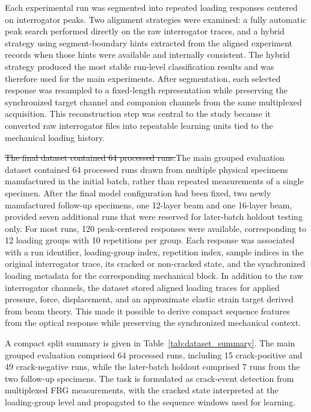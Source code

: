 \documentclass[notspecified,article,submit,pdftex,moreauthors]{Definitions/mdpi}
\newcommand{\rev}[1]{{\color{red}#1}}
\newcommand{\revdel}[1]{{\color{red}\sout{#1}}}
\begin{document}
Each experimental run was segmented into repeated loading responses centered on interrogator peaks. Two alignment strategies were examined: a fully automatic peak search performed directly on the raw interrogator traces, and a hybrid strategy using segment-boundary hints extracted from the aligned experiment records when those hints were available and internally consistent. The hybrid strategy produced the most stable run-level classification results and was therefore used for the main experiments. After segmentation, each selected response was resampled to a fixed-length representation while preserving the synchronized target channel and companion channels from the same multiplexed acquisition. This reconstruction step was central to the study because it converted raw interrogator files into repeatable learning units tied to the mechanical loading history.

\revdel{The final dataset contained 64 processed runs.}\rev{The main grouped evaluation dataset contained 64 processed runs drawn from multiple physical specimens manufactured in the initial batch, rather than repeated measurements of a single specimen. After the final model configuration had been fixed, two newly manufactured follow-up specimens, one 12-layer beam and one 16-layer beam, provided seven additional runs that were reserved for later-batch holdout testing only.} For most runs, 120 peak-centered responses were available, corresponding to 12 loading groups with 10 repetitions per group. Each response was associated with a run identifier, loading-group index, repetition index, sample indices in the original interrogator trace, its cracked or non-cracked state, and the synchronized loading metadata for the corresponding mechanical block. In addition to the raw interrogator channels, the dataset stored aligned loading traces for applied pressure, force, displacement, and an approximate elastic strain target derived from beam theory. This made it possible to derive compact sequence features from the optical response while preserving the synchronized mechanical context.

\rev{A compact split summary is given in Table~\ref{tab:dataset_summary}. The main grouped evaluation comprised 64 processed runs, including 15 crack-positive and 49 crack-negative runs, while the later-batch holdout comprised 7 runs from the two follow-up specimens.} The task is formulated as crack-event detection from multiplexed FBG measurements, with the cracked state interpreted at the loading-group level and propagated to the sequence windows used for learning.
\end{document}

